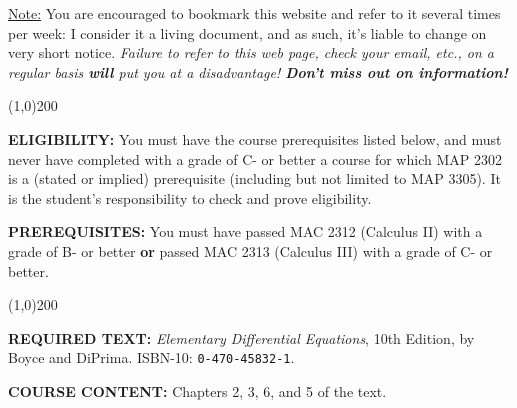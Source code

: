 \documentclass[12pt,oneside]{amsart}
\begin{document}
\vspace{-3mm}
\ul{Note:} You are encouraged to bookmark this website and refer to it several times per week: I consider it a living document, and as such, it's liable to change on very short notice. \textit{Failure to refer to this web page, check your email, etc., on a regular basis \textbf{will} put you at a disadvantage! \textbf{Don't miss out on information!}}

\vspace{-4.5mm}
\begin{center}
	\line(1,0){200}
\end{center}
\vspace{-1.75mm}

\noindent \textbf{ELIGIBILITY:} You must have the course prerequisites listed below, and must never have completed with a grade of C- or better a course for which MAP 2302 is a (stated or implied) prerequisite (including but not limited to MAP 3305). It is the student's responsibility to check and prove eligibility.

\noindent \textbf{PREREQUISITES:} You must have passed MAC 2312 (Calculus II) with a grade of B- or better \textbf{or} passed MAC 2313 (Calculus III) with a grade of C- or better.

\vspace{-4.5mm}
\begin{center}
	\line(1,0){200}
\end{center}
\vspace{-1.75mm}

\noindent \textbf{REQUIRED TEXT:} \textit{Elementary Differential Equations}, 10th Edition, by Boyce and DiPrima. ISBN-10: \texttt{0-470-45832-1}.


\noindent \textbf{COURSE CONTENT:} Chapters 2, 3, 6, and 5 of the text.
\end{document}
